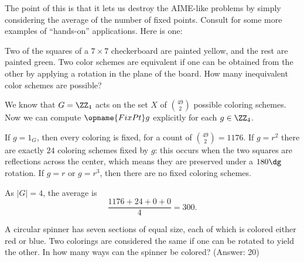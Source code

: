 The point of this is that it lets us destroy the AIME-like problems by simply considering the average of the number of fixed points.
Consult \cite{ref:aops_burnside} 
for some more examples of ``hands-on'' applications.
Here is one:
\begin{example}
	[AIME 1996] Two of the squares of a $7 \times 7$ checkerboard are painted yellow, and the rest are painted green. Two color schemes are equivalent if one can be obtained from the other by applying a rotation in the plane of the board. How many inequivalent color schemes are possible?

	We know that $G = \Zc4$ acts on the set $X$ of $\binom{49}{2}$ possible coloring schemes.
	Now we can compute $\opname{FixPt} g$ explicitly for each $g \in \Zc4$.
	\begin{itemize}
		\ii If $g = 1_G$, then every coloring is fixed, for a count of $\binom{49}{2} = 1176$.
		\ii If $g = r^2$ there are exactly $24$ coloring schemes fixed by $g$:
		this occurs when the two squares are reflections across the center,
		which means they are preserved under a $180\dg$ rotation.
		\ii If $g = r$ or $g=r^3$, then there are no fixed coloring schemes.
	\end{itemize}
	As $\left\lvert G \right\rvert = 4$, the average is
	\[ \frac{1176 + 24 + 0 + 0}{4} = 300. \]
\end{example}
\begin{exercise}
	A circular spinner has seven sections of equal size,
	each of which is colored either red or blue.
	Two colorings are considered the same if one can be rotated to yield the other.
	In how many ways can the spinner be colored? (Answer: 20)
\end{exercise}

